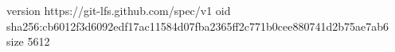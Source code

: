 version https://git-lfs.github.com/spec/v1
oid sha256:cb6012f3d6092edf17ac11584d07fba2365ff2c771b0cee880741d2b75ae7ab6
size 5612
